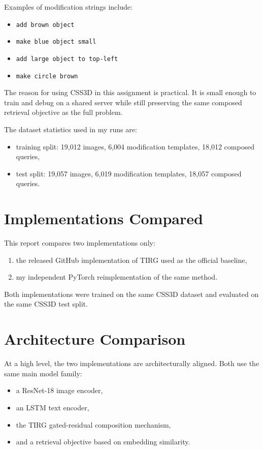 \documentclass[11pt]{article}
\begin{document}
Examples of modification strings include:
\begin{itemize}[leftmargin=*]
  \item \texttt{add brown object}
  \item \texttt{make blue object small}
  \item \texttt{add large object to top-left}
  \item \texttt{make circle brown}
\end{itemize}

The reason for using CSS3D in this assignment is practical. It is small enough to train and debug on a shared server while still preserving the same composed retrieval objective as the full problem.

The dataset statistics used in my runs are:
\begin{itemize}[leftmargin=*]
  \item training split: 19,012 images, 6,004 modification templates, 18,012 composed queries,
  \item test split: 19,057 images, 6,019 modification templates, 18,057 composed queries.
\end{itemize}

\section{Implementations Compared}
This report compares two implementations only:
\begin{enumerate}[leftmargin=*]
  \item the released GitHub implementation of TIRG used as the official baseline,
  \item my independent PyTorch reimplementation of the same method.
\end{enumerate}

Both implementations were trained on the same CSS3D dataset and evaluated on the same CSS3D test split.

\section{Architecture Comparison}
At a high level, the two implementations are architecturally aligned. Both use the same main model family:
\begin{itemize}[leftmargin=*]
  \item a ResNet-18 image encoder,
  \item an LSTM text encoder,
  \item the TIRG gated-residual composition mechanism,
  \item and a retrieval objective based on embedding similarity.
\end{itemize}
\end{document}
